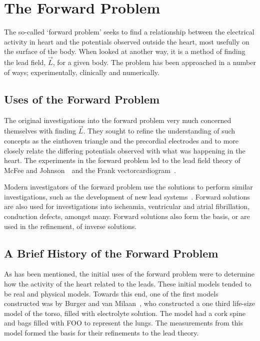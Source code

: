 \section{The Forward Problem}

The so-called `forward problem' seeks to find a relationship between the
electrical activity in heart and the potentials observed outside the heart,
most usefully on the surface of the body.
When looked at another way, it is a method of finding the lead field, $\vec{L}$,
for a given body.
The problem has been approached in a number of ways; experimentally, clinically
and numerically.

\subsection{Uses of the Forward Problem}

The original investigations into the forward problem very much concerned
themselves with finding $\vec{L}$.
They sought to refine the understanding of such concepts as the einthoven
triangle and the precordial electrodes and to more closely relate the differing
potentials observed with what was happening in the heart.
The experiments in the forward problem led to the lead field theory of McFee and
Johnson~\cite{Mcfee1953}\ and the Frank vectorcardiogram~\cite{Frank1956}.

Modern investigators of the forward problem use the solutions to perform similar
investigations, such as the development of new lead systems~\cite{Ihara2007}.
Forward solutions are also used for investigations into ischeamia, ventricular
and atrial fibrillation, conduction defects, amongst many.
Forward solutions also form the basis, or are used in the refinement, of inverse
solutions.

\subsection{A Brief History of the Forward Problem}

As has been mentioned, the initial uses of the forward problem were to determine
how the activity of the heart related to the leads.
These initial models tended to be real and physical models.
Towards this end, one of the first models constructed was by Burger and van
Milaan~\cite{Burger1946}, who constructed a one third life-size model of the
torso, filled with electrolyte solution.
The model had a cork spine and bags filled with FOO to represent the lungs.
The measurements from this model formed the basis for their refinements to the
lead theory.



